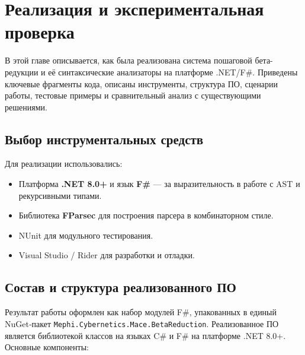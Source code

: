 \chapter{Реализация и экспериментальная проверка}
\label{chapter4}

В этой главе описывается, как была реализована система пошаговой бета-редукции и её синтаксические анализаторы на платформе .NET/F\#. Приведены ключевые фрагменты кода, описаны инструменты, структура ПО, сценарии работы, тестовые примеры и сравнительный анализ с существующими решениями.

\section{Выбор инструментальных средств}
Для реализации использовались:
\begin{itemize}
  \item Платформа \textbf{.NET 8.0+} и язык \textbf{F\#} — за выразительность в работе с AST и рекурсивными типами.
  \item Библиотека \textbf{FParsec} для построения парсера в комбинаторном стиле.
  \item NUnit для модульного тестирования.
  \item Visual Studio / Rider для разработки и отладки.
\end{itemize}

\section{Состав и структура реализованного ПО}
\label{sec:software-structure}

Результат работы оформлен как набор модулей F\#, упакованных в единый NuGet‑пакет \texttt{Mephi.Cybernetics.Mace.BetaReduction}. Реализованное ПО является библиотекой классов на языках C\# и F\# на платформе .NET 8.0+. Основные компоненты:

